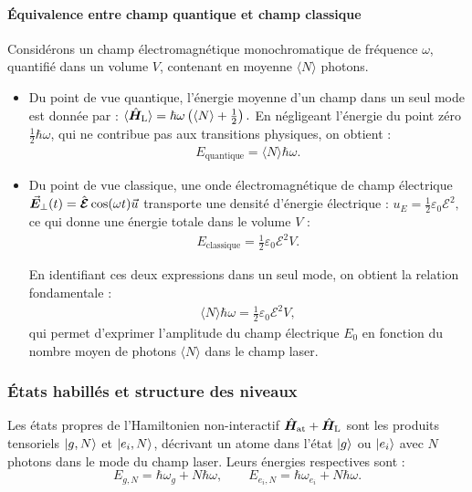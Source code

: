 \paragraph{Équivalence entre champ quantique et champ classique}

Considérons un champ électromagnétique monochromatique de fréquence \( \omega \), quantifié dans un volume \( V \), contenant en moyenne \( \langle N \rangle \) photons.

\begin{itemize}[label = $\bullet$]
  \item Du point de vue quantique, l’énergie moyenne d’un champ dans un seul mode est donnée par :
  \(
  \langle \hat{\bm{H}}_{\mathrm{L}} \rangle = \hbar \omega \left( \langle N \rangle + \frac{1}{2} \right).
  \)
  En négligeant l’énergie du point zéro \( \frac{1}{2} \hbar \omega \), qui ne contribue pas aux transitions physiques, on obtient :
  \begin{eqnarray}
  E_{\mathrm{quantique}} = \langle N \rangle \hbar \omega.
  \end{eqnarray}

  \item Du point de vue classique, une onde électromagnétique de champ électrique \( \vec{{\bm{E}}}_\perp(t) = \hat{\bm{\mathcal{E}}} \cos(\omega t) \vec{u} \) transporte une densité d’énergie électrique :
  \(
  u_E = \frac{1}{2} \varepsilon_0\mathcal{E}^2,
  \)
  ce qui donne une énergie totale dans le volume \( V \) :
  \begin{eqnarray}
  E_{\mathrm{classique}} = \frac{1}{2} \varepsilon_0 \mathcal{E}^2 V.
  \end{eqnarray}
  

	En identifiant ces deux expressions dans un seul mode, on obtient la relation fondamentale :
	\begin{eqnarray}
		\langle N \rangle \hbar \omega = \frac{1}{2} \varepsilon_0 \mathcal{E}^2 V,
	\end{eqnarray}
	qui permet d’exprimer l’amplitude du champ électrique \( E_0 \) en fonction du nombre moyen de photons \( \langle N \rangle \) dans le champ laser.
\end{itemize}

\medskip


\subsubsection{États habillés et structure des niveaux}

Les états propres de l’Hamiltonien non-interactif 
\( \hat{\bm{H}}_{\mathrm{at}} + \hat{\bm{H}}_{\mathrm{L}} \) 
sont les produits tensoriels \( \ket{g, N} \) et \( \ket{e_i, N} \), décrivant un atome dans l’état 
\( \ket{g} \) ou \( \ket{e_i} \) avec \( N \) photons dans le mode du champ laser. 
Leurs énergies respectives sont :
\[
E_{g,N} = \hbar \omega_{g} + N \hbar \omega, 
\qquad 
E_{e_i,N} = \hbar \omega_{e_i}  + N \hbar \omega.
\]

